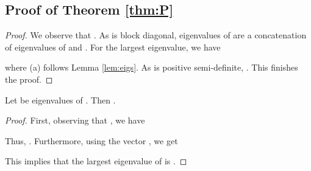\documentclass[sigconf]{acmart}
\begin{document}
\subsection{Proof of Theorem \ref{thm:P}}
\begin{proof}
We observe that .
As  is block diagonal, eigenvalues of  are a concatenation of eigenvalues of  and . For the largest eigenvalue, we have 

where (a) follows Lemma \ref{lem:eigs}. As  is positive semi-definite, . This finishes the proof.
\end{proof}

\begin{lemma} \label{lem:eigs}
    Let  be eigenvalues of . Then .
\end{lemma}
\begin{proof}
First, observing that , we have

Thus, . Furthermore, using the vector , we get 

This implies that the largest eigenvalue of  is .
\end{proof}





\end{document}
